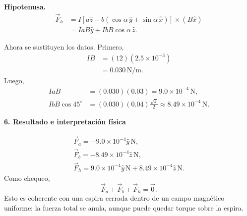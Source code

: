 \documentclass[11pt]{article}
\newcommand{\paso}[1]{%
  \par\medskip
  \noindent\textbf{#1}\par
  \vspace{0.1em}%
}
\begin{document}
\textbf{Hipotenusa.}
\begin{align*}
    \vec F_h
    &=I\left[a\hat z-b(\cos\alpha\,\hat y+\sin\alpha\,\hat x)\right]\times(B\hat x)\\
    &=IaB\hat y+IbB\cos\alpha\,\hat z.
\end{align*}

Ahora se sustituyen los datos. Primero,
\begin{align*}
    IB&=(12)(2.5\times10^{-3})\\
      &=0.030\,\mathrm{N/m}.
\end{align*}
Luego,
\begin{align*}
    IaB&=(0.030)(0.03)=9.0\times10^{-4}\,\mathrm N,\\
    IbB\cos45^\circ&=(0.030)(0.04)\frac{\sqrt2}{2}
    \approx8.49\times10^{-4}\,\mathrm N.
\end{align*}

\paso{6. Resultado e interpretaci\'on f\'isica}
\begin{align*}
    \boxed{\vec F_a=-9.0\times10^{-4}\hat y\,\mathrm N},\\
    \boxed{\vec F_b=-8.49\times10^{-4}\hat z\,\mathrm N},\\
    \boxed{\vec F_h=9.0\times10^{-4}\hat y\,\mathrm N+8.49\times10^{-4}\hat z\,\mathrm N}.
\end{align*}
Como chequeo,
\begin{equation*}
    \vec F_a+\vec F_b+\vec F_h=\vec0.
\end{equation*}
Esto es coherente con una espira cerrada dentro de un campo magn\'etico uniforme: la fuerza total se anula, aunque puede quedar torque sobre la espira.
\end{document}
